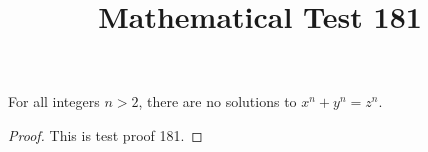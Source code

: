 \documentclass{amsart}
\begin{document}
\title{Mathematical Test 181}
\begin{theorem}
For all integers $n > 2$, there are no solutions to $x^n + y^n = z^n$.
\end{theorem}
\begin{proof}
This is test proof 181.
\end{proof}
\end{document}
